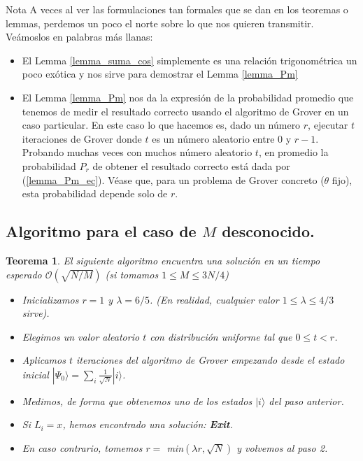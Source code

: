 \documentclass[a4paper,11pt]{book} %
\newtheorem{teorema_contador}{Teorema}
\newcommand{\Teorema}[1]{
		\begin{mybox_gray2}{}
			\begin{teorema_contador}
				 #1 
			\end{teorema_contador} 
		\end{mybox_gray2}
	}
\numberwithin{equation}{chapter}
\begin{document}
	\begin{mybox_blue}{Nota}
	A veces al ver las formulaciones tan formales que se dan en los teoremas o lemmas, perdemos un poco el 
	norte sobre lo que nos quieren transmitir. Veámoslos en palabras más llanas:
	\begin{itemize}
		\item El Lemma \ref{lemma_suma_cos} simplemente es una relación trigonométrica un poco exótica y nos
		 sirve para demostrar el Lemma \ref{lemma_Pm}

		\item El Lemma \ref{lemma_Pm} nos da la expresión de la probabilidad promedio que tenemos de medir el 
		resultado correcto usando el algoritmo de Grover en un caso particular. En este caso lo que hacemos es, 
		dado un número $r$, ejecutar $t$ iteraciones de Grover donde $t$ es un número aleatorio  entre $0$ y 
		$r-1$. Probando muchas veces con muchos número aleatorio $t$, en promedio la probabilidad 
		$P_r$ de obtener el resultado correcto está dada por (\ref{lemma_Pm_ec}). Véase que, para un problema de 
		Grover concreto ($\theta$ fijo), esta probabilidad depende solo de $r$. 
	\end{itemize}
	\end{mybox_blue}

\subsection{Algoritmo para el caso de $M$ desconocido.}

\Teorema{ \label{teorema_no-t}
El siguiente algoritmo encuentra una solución en un tiempo esperado $\mathcal{O} ( \sqrt{N/M} )$ (si tomamos $1 \leq M \leq 3N/4$)
\begin{itemize}

\item[1.] Inicializamos $r=1$ y $\lambda = 6/5$. (En realidad, cualquier valor $1 \leq \lambda \leq 4/3$ sirve).

\item[2.] Elegimos un valor aleatorio $t$ con distribución uniforme tal que $0 \leq t < r$.

\item[3.] Aplicamos $t$ iteraciones del algoritmo de Grover empezando desde el estado inicial $| \Psi_0 \rangle = \sum_i \frac{1}{\sqrt{N}} |i \rangle$.

\item[4.] Medimos, de forma que obtenemos uno de los estados $|i \rangle$ del paso anterior. 

\item[5.] Si $L_i = x$, hemos encontrado una solución:  \textbf{Exit}.

\item[6.] En caso contrario, tomemos $r = $ min$(\lambda r, \sqrt{N})$ y volvemos al paso 2.
\end{itemize}
}
\end{document}
